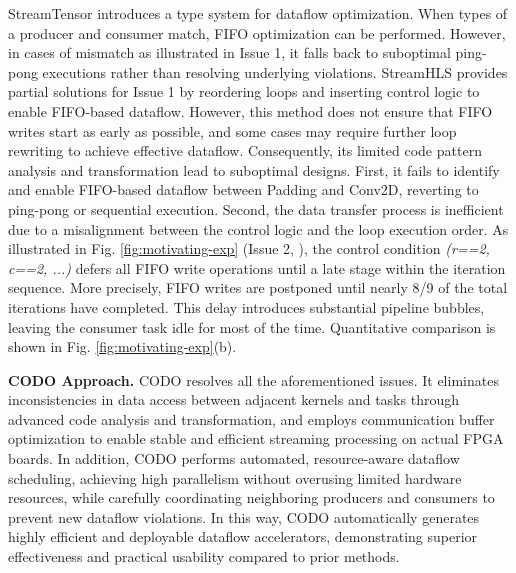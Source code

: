 \documentclass[conference]{IEEEtran}
\begin{document}
StreamTensor \cite{streamtensorMICRO25} introduces a type system for dataflow optimization. When types of a producer and consumer match, FIFO optimization can be performed. However, in cases of mismatch as illustrated in Issue 1, it falls back to suboptimal ping-pong executions rather than resolving underlying violations.
StreamHLS \cite{streamhlsFPGA25} provides partial solutions for Issue 1 by reordering loops and inserting control logic to enable FIFO-based dataflow. 
However, this method does not ensure that FIFO writes start as early as possible, and some cases may require further loop rewriting to achieve effective dataflow.
Consequently, its limited code pattern analysis and transformation lead to suboptimal designs.
First, it fails to identify and enable FIFO-based dataflow between Padding and Conv2D, reverting to ping-pong or sequential execution. 
Second, the data transfer process is inefficient due to a misalignment between the control logic and the loop execution order. As illustrated in Fig. \ref{fig:motivating-exp} (Issue 2, ), the control condition \textit{(r==2, c==2, ...)} defers all FIFO write operations until a late stage within the iteration sequence. More precisely, FIFO writes are postponed until nearly 8/9 of the total iterations have completed. This delay introduces substantial pipeline bubbles, leaving the consumer task idle for most of the time.
Quantitative comparison is shown in Fig. \ref{fig:motivating-exp}(b). 


\textbf{CODO Approach.} CODO resolves all the aforementioned issues. It eliminates inconsistencies in data access between adjacent kernels and tasks through advanced code analysis and transformation, and employs communication buffer optimization to 
enable stable and efficient streaming processing on actual FPGA boards. 
In addition, CODO performs automated, resource-aware dataflow scheduling, achieving high parallelism without overusing limited hardware resources, while carefully coordinating neighboring producers and consumers to prevent new dataflow violations. 
In this way, CODO automatically generates highly efficient and deployable dataflow 
accelerators, demonstrating superior effectiveness and practical usability compared to prior methods.
\end{document}
